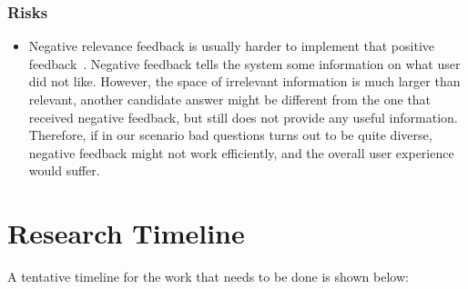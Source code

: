 \subsubsection{Risks}
\label{section:proposal:plan:users:risks}

\begin{itemize}
\item Negative relevance feedback is usually harder to implement that positive feedback~\cite{wang2008study}.
Negative feedback tells the system some information on what user did not like.
However, the space of irrelevant information is much larger than relevant, \ie another candidate answer might be different from the one that received negative feedback, but still does not provide any useful information.
Therefore, if in our scenario bad questions turns out to be quite diverse, negative feedback might not work efficiently, and the overall user experience would suffer.
\end{itemize}

\section{Research Timeline}
\label{section:proposal:timeline}

A tentative timeline for the work that needs to be done is shown below:

